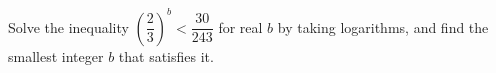 Solve the inequality $\left(\dfrac{2}{3}\right)^b<\dfrac{30}{243}$ for real $b$ by taking logarithms, and find the smallest integer $b$ that satisfies it.
